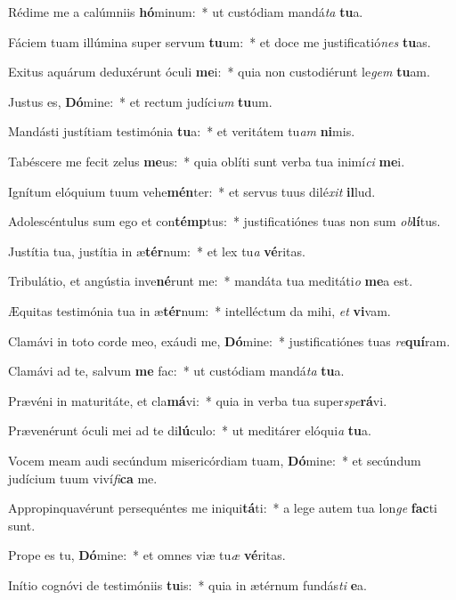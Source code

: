 \item Rédime me a calúmniis \textbf{hó}minum:~* ut custódiam mandá\textit{ta} \textbf{tu}a.
\item Fáciem tuam illúmina super servum \textbf{tu}um:~* et doce me justificatió\textit{nes} \textbf{tu}as.
\item Exitus aquárum deduxérunt óculi \textbf{me}i:~* quia non custodiérunt le\textit{gem} \textbf{tu}am.
\item Justus es, \textbf{Dó}mine:~* et rectum judíci\textit{um} \textbf{tu}um.
\item Mandásti justítiam testimónia \textbf{tu}a:~* et veritátem tu\textit{am} \textbf{ni}mis.
\item Tabéscere me fecit zelus \textbf{me}us:~* quia oblíti sunt verba tua inimí\textit{ci} \textbf{me}i.
\item Ignítum elóquium tuum vehe\textbf{mén}ter:~* et servus tuus dilé\textit{xit} \textbf{il}lud.
\item Adolescéntulus sum ego et con\textbf{témp}tus:~* justificatiónes tuas non sum \textit{ob}\textbf{lí}tus.
\item Justítia tua, justítia in æ\textbf{tér}num:~* et lex tu\textit{a} \textbf{vé}ritas.
\item Tribulátio, et angústia inve\textbf{né}runt me:~* mandáta tua meditáti\textit{o} \textbf{me}a est.
\item Æquitas testimónia tua in æ\textbf{tér}num:~* intelléctum da mihi, \textit{et} \textbf{vi}vam.
\item Clamávi in toto corde meo, exáudi me, \textbf{Dó}mine:~* justificatiónes tuas \textit{re}\textbf{quí}ram.
\item Clamávi ad te, salvum \textbf{me} fac:~* ut custódiam mandá\textit{ta} \textbf{tu}a.
\item Prævéni in maturitáte, et cla\textbf{má}vi:~* quia in verba tua super\textit{spe}\textbf{rá}vi.
\item Prævenérunt óculi mei ad te di\textbf{lú}culo:~* ut meditárer elóqui\textit{a} \textbf{tu}a.
\item Vocem meam audi secúndum misericórdiam tuam, \textbf{Dó}mine:~* et secúndum judícium tuum viví\textit{fi}\textbf{ca} me.
\item Appropinquavérunt persequéntes me iniqui\textbf{tá}ti:~* a lege autem tua lon\textit{ge} \textbf{fac}ti sunt.
\item Prope es tu, \textbf{Dó}mine:~* et omnes viæ tu\textit{æ} \textbf{vé}ritas.
\item Inítio cognóvi de testimóniis \textbf{tu}is:~* quia in ætérnum fundás\textit{ti} \textbf{e}a.
